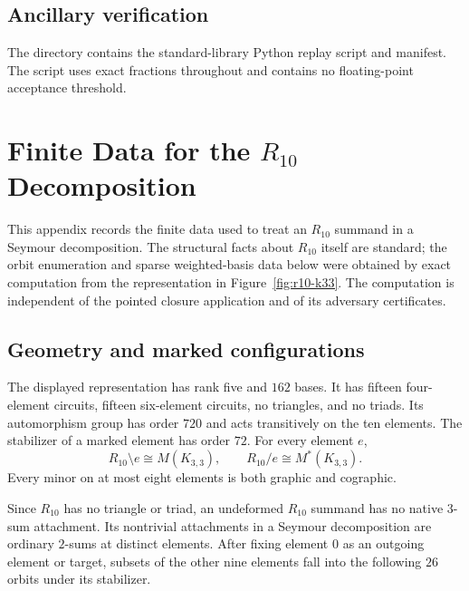 \documentclass[11pt]{article}
\numberwithin{equation}{section}
\theoremstyle{remark}
\begin{document}
\subsection{Ancillary verification}
\label{app:r10-program-ancillary}

The directory  contains the
standard-library Python replay script and manifest. The script uses exact
fractions throughout and contains no floating-point acceptance threshold.


\section{Finite Data for the \texorpdfstring{$R_{10}$}{R10} Decomposition}
\label{app:r10-atlas}

This appendix records the finite data used to treat an $R_{10}$ summand in a
Seymour decomposition. The structural facts about $R_{10}$ itself are
standard; the orbit enumeration and sparse weighted-basis data below were
obtained by exact computation from the representation in
Figure~\ref{fig:r10-k33}. The computation is independent of the pointed
closure application and of its adversary certificates.

\subsection{Geometry and marked configurations}
\label{app:r10-atlas-geometry}

The displayed representation has rank five and $162$ bases. It has fifteen
four-element circuits, fifteen six-element circuits, no triangles, and no
triads. Its automorphism group has order $720$ and acts transitively on the
ten elements. The stabilizer of a marked element has order $72$. For every
element $e$,
\begin{equation}
    R_{10}\setminus e\cong M(K_{3,3}),
    \qquad
    R_{10}/e\cong M^*(K_{3,3}).
    \label{eq:r10-atlas-single-minors}
\end{equation}
Every minor on at most eight elements is both graphic and cographic.

Since $R_{10}$ has no triangle or triad, an undeformed $R_{10}$ summand has
no native $3$-sum attachment. Its nontrivial attachments in a Seymour
decomposition are ordinary $2$-sums at distinct elements. After
fixing element $0$ as an outgoing element or target, subsets of the other
nine elements fall into the following $26$ orbits under its stabilizer.
\end{document}

